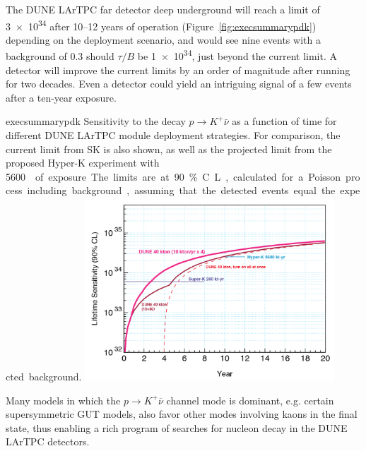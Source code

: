 The DUNE LArTPC far detector deep underground will reach a limit of
\SI{3e34}{\year} after 10--12 years of operation
(Figure~\ref{fig:execsummarypdk}) depending on the deployment
scenario, and would see nine events with a background of 0.3 should
$\tau/B$ be \SI{1e34}{\year}, just beyond the current limit. A
 detector will improve the current limits by an order of
magnitude after running for two decades. Even a  detector
could yield an intriguing signal of a few events after a ten-year
exposure.



\begin{cdrfigure}{execsummarypdk} {Sensitivity to the
    decay $p\to K^+ \bar{\nu}$ as a function of time for different DUNE 
LArTPC module deployment strategies. 
  For comparison, the current limit from SK is also shown, as well as the projected limit from the proposed Hyper-K experiment with \SI{5600}\ktyr{} of exposure.
  The limits are at 90\% C.L., calculated for
  a Poisson process including background, assuming that the detected events
  equal the expected background.}
\includegraphics[width=0.7\textwidth]{figures/lar4x10.png}
\end{cdrfigure}

Many models in which the $p\to K^+\overline{\nu}$ channel mode is
dominant, e.g. certain supersymmetric GUT models, also favor other
modes involving kaons in the final state, thus enabling a rich program
of searches for nucleon decay in the DUNE LArTPC detectors.


